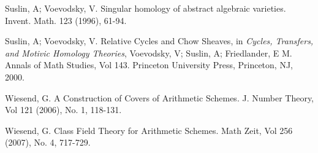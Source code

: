 \documentclass[12pt,twoside,reqno]{amsart}
\theoremstyle{definition}
\numberwithin{equation}{section}
\begin{document}
\begin{thebibliography}{99}
 Suslin, A; Voevodsky, V. Singular homology of abstract
algebraic varieties. Invent. Math. 123 (1996), 61-94.

 Suslin, A; Voevodsky, V. Relative Cycles and Chow Sheaves, in
\emph{Cycles, Transfers, and Motivic Homology Theories}, Voevodsky, V;
Suslin, A; Friedlander, E M. Annals of Math Studies, Vol 143. Princeton
University Press, Princeton, NJ, 2000.

 Wiesend, G. A Construction of Covers of Arithmetic Schemes. J.
Number Theory, Vol 121 (2006), No. 1, 118-131.

 Wiesend, G. Class Field Theory for Arithmetic Schemes. Math
Zeit, Vol 256 (2007), No. 4, 717-729.
\end{thebibliography}
\end{document}
